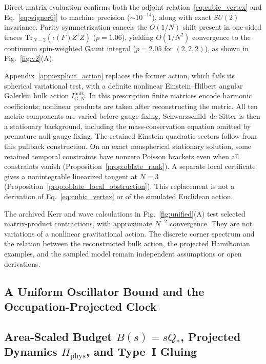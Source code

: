 \documentclass[onecolumn,11pt,aps,prd,amsmath,amssymb,nofootinbib,floatfix]{revtex4-2}
\newcommand{\Tr}{\mathrm{Tr}}
\begin{document}
Direct matrix evaluation confirms both the adjoint relation~\eqref{eq:cubic_vertex} and Eq.~\eqref{eq:wigner6j} to machine precision ($\sim 10^{-14}$), along with exact $SU(2)$ invariance. Parity symmetrization cancels the $O(1/N)$ shift present in one-sided traces $\Tr_{N-2}(\iota(F)Z^\dagger Z)$ ($p=1.06$), yielding $O(1/N^2)$ convergence to the continuum spin-weighted Gaunt integral ($p=2.05$ for $(2,2,2)$), as shown in Fig.~\ref{fig:v2}(A).

Appendix~\ref{app:explicit_action} replaces the former action, which fails its spherical variational test, with a definite nonlinear Einstein--Hilbert angular Galerkin bulk action $I_{\mathrm{G},N}^{\mathrm{bulk}}$. In this prescription finite matrices encode harmonic coefficients; nonlinear products are taken after reconstructing the metric. All ten metric components are varied before gauge fixing. Schwarzschild--de Sitter is then a stationary background, including the mass-conservation equation omitted by premature null gauge fixing. The retained Einstein quadratic sectors follow from this pullback construction. On an exact nonspherical stationary solution, some retained temporal constraints have nonzero Poisson brackets even when all constraints vanish (Proposition~\ref{prop:oblate_rank}). A separate local certificate gives a nonintegrable linearized tangent at $N=3$ (Proposition~\ref{prop:oblate_local_obstruction}). This replacement is not a derivation of Eq.~\eqref{eq:cubic_vertex} or of the simulated Euclidean action.

The archived Kerr and wave calculations in Fig.~\ref{fig:unified}(A) test selected matrix-product contractions, with approximate $N^{-2}$ convergence. They are not variations of a nonlinear gravitational action. The discrete corner spectrum and the relation between the reconstructed bulk action, the projected Hamiltonian examples, and the sampled model remain independent assumptions or open derivations.

\subsection{A Uniform Oscillator Bound and the Occupation-Projected Clock}\label{sec:unified_clock}



\subsection{Area-Scaled Budget $B(s)=s Q_*$, Projected Dynamics $H_{\mathrm{phys}}$, and Type~I Gluing}\label{sec:unified_H}
\end{document}
